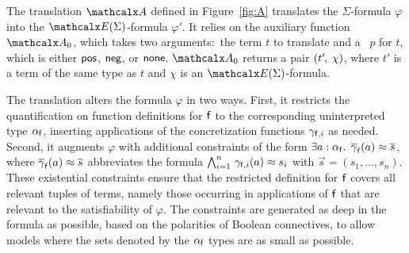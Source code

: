 The translation $\conv$ defined in Figure~\ref{fig:A} translates the $\Sigma$-formula
$\varphi$ into the $\extendsig{\Sigma}$-formula $\varphi'$. It relies
on the auxiliary function $\conv_0$, which takes two arguments:\ the term $t$
to translate and a ~$p$ for $t$, which is either $\mathsf{pos}$, $\mathsf{neg}$, or
$\mathsf{none}$.
\vthinspace$\conv_0$ returns a pair $( t'\negvthinspace,\, \chi )$, where $t'$ is a term of
the same type as $t$ and $\chi$ is an $\extendsig{\Sigma}$-formula.



The translation alters the formula $\varphi$ in two ways. First, it restricts the
quantification on function definitions for $\mathsf{f}$ to the corresponding
uninterpreted type $\alpha_{\mathsf{f}}$, inserting applications of the concretization functions $\gamma_{\mathsf{f},i}$ as needed.
Second, it augments $\varphi$ with additional constraints of the form
$\exists a :\nobreak \alpha_{\mathsf{f}}.\;\, \overline{\gamma}_{\mathsf{f}}( a ) \approx \overline{s}$,
where $\overline{\gamma}_{\mathsf{f}}( a ) \approx \overline{s}$ abbreviates the formula
$\bigwedge_{i=1}^n\, \gamma_{\mathsf{f},i}(a) \approx s_i$
with $\vec s = (s_1,\dotsc,s_n)$.
These existential %
constraints
ensure that the restricted definition for $\mathsf{f}$ covers all relevant tuples
of terms, namely those occurring in applications of $\mathsf{f}$
that are relevant to the satisfiability of $\varphi$. The constraints are
generated as deep in the formula as possible, based on the
polarities of Boolean connectives, to allow models where the sets
denoted by the $\alpha_{\mathsf{f}}$ types are as small as possible.

